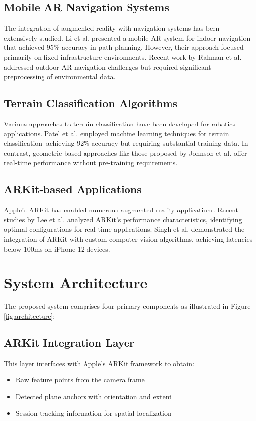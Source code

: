 \documentclass[conference]{IEEEtran}
\begin{document}
\subsection{Mobile AR Navigation Systems}

The integration of augmented reality with navigation systems has been extensively studied. Li et al. \cite{Li2024mobileAR} presented a mobile AR system for indoor navigation that achieved 95\% accuracy in path planning. However, their approach focused primarily on fixed infrastructure environments. Recent work by Rahman et al. \cite{Rahman2023outdoorAR} addressed outdoor AR navigation challenges but required significant preprocessing of environmental data.

\subsection{Terrain Classification Algorithms}

Various approaches to terrain classification have been developed for robotics applications. Patel et al. \cite{Patel2024terrainML} employed machine learning techniques for terrain classification, achieving 92\% accuracy but requiring substantial training data. In contrast, geometric-based approaches like those proposed by Johnson et al. \cite{Johnson2023geometricTerrain} offer real-time performance without pre-training requirements.

\subsection{ARKit-based Applications}

Apple's ARKit has enabled numerous augmented reality applications. Recent studies by Lee et al. \cite{Lee2023arkitPerformance} analyzed ARKit's performance characteristics, identifying optimal configurations for real-time applications. Singh et al. \cite{Singh2024arkitIntegration} demonstrated the integration of ARKit with custom computer vision algorithms, achieving latencies below 100ms on iPhone 12 devices.

\section{System Architecture}

The proposed system comprises four primary components as illustrated in Figure \ref{fig:architecture}:

\subsection{ARKit Integration Layer}
This layer interfaces with Apple's ARKit framework to obtain:
\begin{itemize}
    \item Raw feature points from the camera frame
    \item Detected plane anchors with orientation and extent
    \item Session tracking information for spatial localization
\end{itemize}
\end{document}
